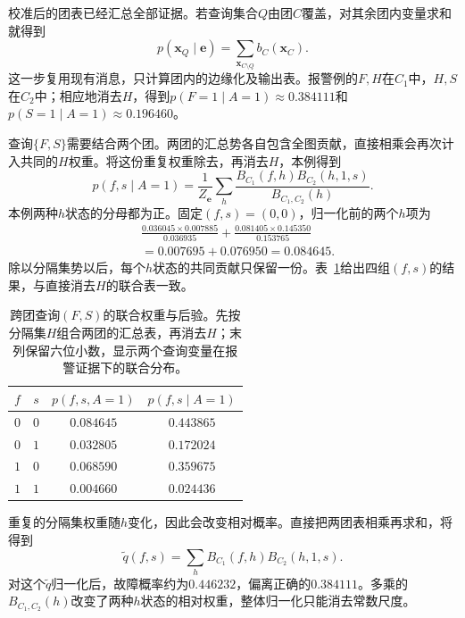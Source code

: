 校准后的团表已经汇总全部证据。若查询集合$Q$由团$C$覆盖，对其余团内变量求和就得到
\begin{equation}
  p(\bm{x}_Q\mid\bm{e})
    =\sum_{\bm{x}_{C\setminus Q}}b_C(\bm{x}_C).
  \label{eq:pgm-junction-tree-covered-query}
\end{equation}
这一步复用现有消息，只计算团内的边缘化及输出表。报警例的$F,H$在$C_1$中，$H,S$在$C_2$中；相应地消去$H$，得到$p(F=1\mid A=1)\approx0.384111$和$p(S=1\mid A=1)\approx0.196460$。

查询$\{F,S\}$需要结合两个团。两团的汇总势各自包含全图贡献，直接相乘会再次计入共同的$H$权重。将这份重复权重除去，再消去$H$，本例得到
\begin{equation}
  p(f,s\mid A=1)
    =\frac{1}{Z_{\bm{e}}}
      \sum_h
       \frac{B_{C_1}(f,h)B_{C_2}(h,1,s)}
            {B_{C_1,C_2}(h)}.
  \label{eq:pgm-junction-tree-cross-clique-device}
\end{equation}
本例两种$h$状态的分母都为正。固定$(f,s)=(0,0)$，归一化前的两个$h$项为
\[
  \begin{aligned}
    &\frac{0.036045\times0.007885}{0.036935}
     +\frac{0.081405\times0.145350}{0.153765}\\
    &=0.007695+0.076950=0.084645.
  \end{aligned}
\]
除以分隔集势以后，每个$h$状态的共同贡献只保留一份。表~\ref{tab:pgm-junction-tree-cross-query}给出四组$(f,s)$的结果，与直接消去$H$的联合表一致。

\begin{table}[htbp]
  \centering
  \begin{tabular}{cccc}
    \toprule
    $f$ & $s$ & $p(f,s,A=1)$ & $p(f,s\mid A=1)$\\
    \midrule
    $0$ & $0$ & $0.084645$ & $0.443865$\\
    $0$ & $1$ & $0.032805$ & $0.172024$\\
    $1$ & $0$ & $0.068590$ & $0.359675$\\
    $1$ & $1$ & $0.004660$ & $0.024436$\\
    \bottomrule
  \end{tabular}
  \caption{跨团查询$(F,S)$的联合权重与后验。先按分隔集$H$组合两团的汇总表，再消去$H$；末列保留六位小数，显示两个查询变量在报警证据下的联合分布。}
  \label{tab:pgm-junction-tree-cross-query}
\end{table}

重复的分隔集权重随$h$变化，因此会改变相对概率。直接把两团表相乘再求和，将得到
\[
  \widetilde{q}(f,s)=\sum_h B_{C_1}(f,h)B_{C_2}(h,1,s).
\]
对这个$\widetilde q$归一化后，故障概率约为$0.446232$，偏离正确的$0.384111$。多乘的$B_{C_1,C_2}(h)$改变了两种$h$状态的相对权重，整体归一化只能消去常数尺度。

